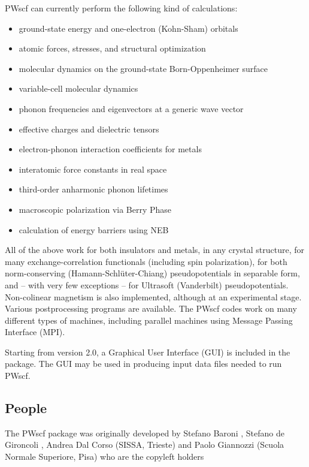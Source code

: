 \documentclass[12pt]{article}
\begin{document}
PWscf can currently perform the following kind of calculations:
\begin{itemize}
\item ground-state energy and one-electron (Kohn-Sham) orbitals
\item atomic forces, stresses, and structural optimization
\item molecular dynamics on the ground-state Born-Oppenheimer surface
\item variable-cell molecular dynamics
\item phonon frequencies and eigenvectors at a generic wave vector
\item effective charges and dielectric tensors
\item electron-phonon interaction coefficients for metals
\item interatomic force constants in real space
\item third-order anharmonic phonon lifetimes
\item macroscopic polarization via Berry Phase
\item calculation of energy barriers using NEB
\end{itemize}
All of the above work for both insulators and metals, in any crystal
structure, for many exchange-correlation functionals (including spin
polarization), for both norm-conserving (Hamann-Schl\"uter-Chiang)
pseudopotentials in separable form, and -- with very few exceptions --
for Ultrasoft (Vanderbilt) pseudopotentials. Non-colinear magnetism is
also implemented, although at an experimental stage.  Various
postprocessing programs are available.  The PWscf codes work on many
different types of machines, including parallel machines using Message
Passing Interface (MPI).

Starting from version 2.0, a Graphical User Interface (GUI) is included
in the package. The GUI may be used in producing input data files needed
to run PWscf.

\subsection{People}


The PWscf package was originally developed by
Stefano Baroni 
,
Stefano de Gironcoli
,
Andrea Dal Corso
(SISSA, Trieste) and Paolo Giannozzi
(Scuola Normale Superiore, Pisa)
who are the copyleft holders
\end{document}
